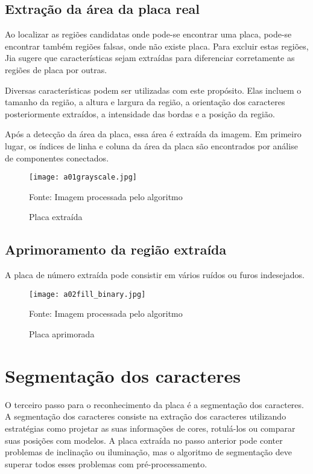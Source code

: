 \subsection{Extração da área da placa real}

Ao localizar as regiões candidatas onde pode-se encontrar uma placa, pode-se encontrar também regiões falsas, onde não existe placa. Para excluir estas regiões, Jia \cite{jia2007region} sugere que características sejam extraídas para diferenciar corretamente as regiões de placa por outras. 

Diversas características podem ser utilizadas com este propósito. Elas incluem o tamanho da região, a altura e largura da região, a orientação dos caracteres posteriormente extraídos, a intensidade das bordas e a posição da região.
 
Após a detecção da área da placa, essa área é extraída da imagem. Em primeiro lugar, os índices de linha e coluna da área da placa são encontrados por análise de componentes conectados.

\begin{figure}[H]
	\centering
	\texttt{[image: a01grayscale.jpg]}
	\caption{Placa extraída}
Fonte: Imagem processada pelo algoritmo
	\label{fig:ext_true_number_plate}
\end{figure}

\subsection{Aprimoramento da região extraída}

A placa de número extraída pode consistir em vários ruídos ou furos indesejados.

\begin{figure}[H]
	\centering
	\texttt{[image: a02fill\_binary.jpg]}
	\caption{Placa aprimorada}
Fonte: Imagem processada pelo algoritmo
	\label{fig:ext_enhanced_number_plate}
\end{figure}

\section{Segmentação dos caracteres}
\label{sec:segmentacao}

O terceiro passo para o reconhecimento da placa é a segmentação dos caracteres.
A segmentação dos caracteres consiste na extração dos caracteres utilizando
estratégias como projetar as suas informações de cores, rotulá-los ou comparar
suas posições com modelos. A placa extraída no passo anterior pode conter
problemas de inclinação ou iluminação, mas o algoritmo de segmentação deve
superar todos esses problemas com pré-processamento.~\cite{s2013automatic}


